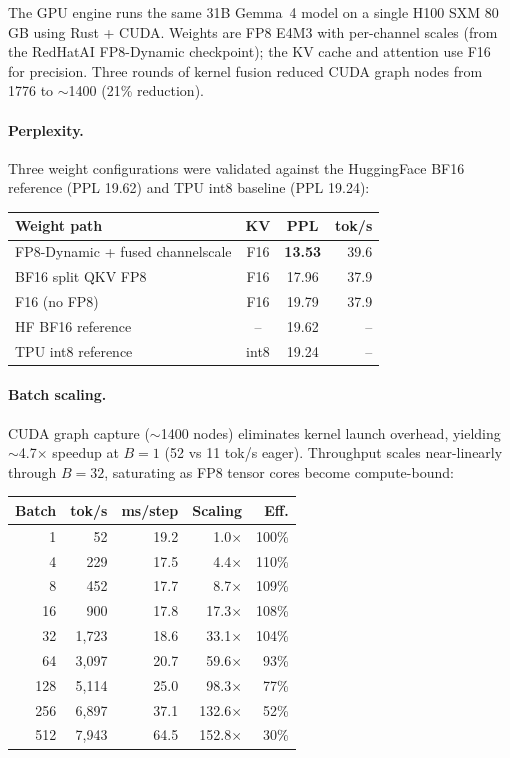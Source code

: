 The GPU engine runs the same 31B Gemma~4 model on a single H100 SXM
80\,GB using Rust + CUDA. Weights are FP8 E4M3 with per-channel scales
(from the RedHatAI FP8-Dynamic checkpoint); the KV cache and attention
use F16 for precision. Three rounds of kernel fusion reduced CUDA graph
nodes from 1776 to ${\sim}$1400 (21\% reduction).

\paragraph{Perplexity.}
Three weight configurations were validated against the HuggingFace
BF16 reference (PPL 19.62) and TPU int8 baseline (PPL 19.24):

\begin{center}
\begin{tabular}{lccr}
\toprule
\textbf{Weight path} & \textbf{KV} & \textbf{PPL} & \textbf{tok/s} \\
\midrule
FP8-Dynamic + fused channelscale & F16 & \textbf{13.53} & 39.6 \\
BF16 split QKV FP8      & F16 & 17.96 & 37.9 \\
F16 (no FP8)             & F16 & 19.79 & 37.9 \\
HF BF16 reference        & --  & 19.62 & -- \\
TPU int8 reference        & int8 & 19.24 & -- \\
\bottomrule
\end{tabular}
\end{center}

\paragraph{Batch scaling.}
CUDA graph capture (${\sim}$1400 nodes) eliminates kernel launch overhead,
yielding ${\sim}$4.7$\times$ speedup at $B{=}1$ (52 vs 11 tok/s eager).
Throughput scales near-linearly through $B{=}32$, saturating as FP8
tensor cores become compute-bound:

\begin{center}
\begin{tabular}{rrrrr}
\toprule
\textbf{Batch} & \textbf{tok/s} & \textbf{ms/step} & \textbf{Scaling} & \textbf{Eff.} \\
\midrule
1   & 52    & 19.2 & 1.0$\times$   & 100\% \\
4   & 229   & 17.5 & 4.4$\times$   & 110\% \\
8   & 452   & 17.7 & 8.7$\times$   & 109\% \\
16  & 900   & 17.8 & 17.3$\times$  & 108\% \\
32  & 1,723 & 18.6 & 33.1$\times$  & 104\% \\
64  & 3,097 & 20.7 & 59.6$\times$  & 93\%  \\
128 & 5,114 & 25.0 & 98.3$\times$  & 77\%  \\
256 & 6,897 & 37.1 & 132.6$\times$ & 52\%  \\
512 & 7,943 & 64.5 & 152.8$\times$ & 30\%  \\
\bottomrule
\end{tabular}
\end{center}

